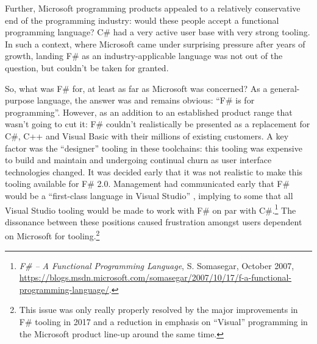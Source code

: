\documentclass[acmsmall,review]{acmart}\settopmatter{printfolios=true,printccs=false,printacmref=false}
\begin{document}
Further, Microsoft programming products appealed to a relatively conservative end of the programming industry: would these people accept a functional programming language? C\# had a very active user base with very strong tooling. In such a context, where Microsoft came under surprising pressure after years of growth, landing F\# as an industry-applicable language was not out of the question, but couldn’t be taken for granted.

So, what was F\# for, at least as far as Microsoft was concerned?  As a general-purpose language, the answer was and remains
obvious: “F\# is for programming”.  However, as an addition to an established product range that wasn’t going
to cut it: F\# couldn’t realistically be presented as a replacement for C\#, C++ and Visual Basic with their millions of existing customers.
A key factor was the “designer” tooling in these toolchains: this tooling was expensive to build and maintain and undergoing continual
churn as user interface technologies changed. It was decided early that it was not realistic to make this tooling available for F\# 2.0.
Management had communicated early that F\# would be a “first-class language in Visual Studio” , implying to some that all Visual Studio
tooling would be made to work with F\# on par with C\#.\footnote{\textit{F\# – A Functional Programming Language}, S. Somasegar, October 2007, \url{https://blogs.msdn.microsoft.com/somasegar/2007/10/17/f-a-functional-programming-language/}.}
The dissonance between these positions caused frustration amongst users dependent on Microsoft for
tooling.\footnote{ This issue was only really properly resolved by the major improvements in F\# tooling in 2017 and a reduction in emphasis on “Visual” programming in the Microsoft product line-up around the same time.}
\end{document}
